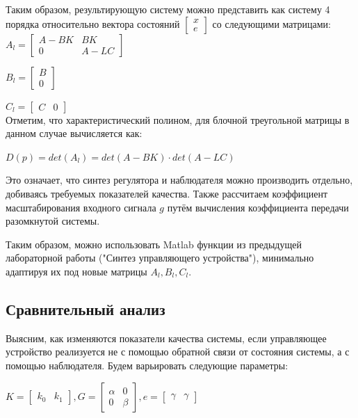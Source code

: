 \documentclass[14pt,a4paper,report]{report}
\begin{document}
Таким образом, результирующую систему можно представить как систему 4 порядка относительно вектора состояний
$\begin{bmatrix} x \\ e \end{bmatrix}$
со следующими матрицами:\\

$A_{l}=\begin{bmatrix} A-BK & BK \\ 0 & A-LC \end{bmatrix}$

$B_{l}=\begin{bmatrix} B \\ 0 \end{bmatrix}$

$C_{l}=\begin{bmatrix} C & 0 \end{bmatrix}$\\

Отметим, что характеристический полином, для блочной треугольной матрицы в данном случае вычисляется как:

$D(p)=det(A_{l})=det(A-BK)\cdot det(A-LC)$

Это означает, что синтез регулятора и наблюдателя можно производить отдельно, добиваясь требуемых показателей качества. Также рассчитаем коэффициент масштабирования входного сигнала $g$ путём вычисления коэффициента передачи разомкнутой системы.

Таким образом, можно использовать Matlab функции из предыдущей лабораторной работы ("Синтез управляющего устройства"), минимально адаптируя их под новые матрицы $A_l, B_l, C_l$.

\subsection{Сравнительный анализ}

Выясним, как изменяются показатели качества системы, если управляющее устройство реализуется не с помощью обратной связи от состояния системы, а с помощью наблюдателя. Будем варьировать следующие параметры:

\begin{center}
$K=\begin{bmatrix} k_0 & k_1 \end{bmatrix}, G=\begin{bmatrix} \alpha & 0 \\ 0 & \beta \end{bmatrix}, e=\begin{bmatrix} \gamma & \gamma \end{bmatrix}$
\end{center}
\end{document}
